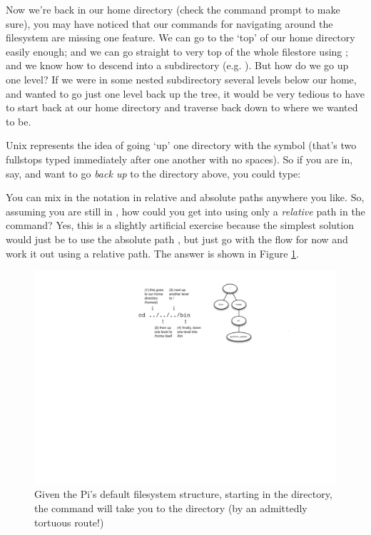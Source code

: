 Now we're back in our home directory (check the command prompt to make sure), you may have noticed that our commands for navigating around the filesystem are missing one feature. We can go to the `top' of our home directory easily enough; and we can go straight to very top of the whole filestore using ; and we know how to descend into a subdirectory (e.g. ). But how do we go up one level? If we were in some nested subdirectory several levels below our home, and wanted to go just one level back up the tree, it would be very tedious to have to start back at our home directory and traverse back down to where we wanted to be. 

Unix represents the idea of going `up' one directory with the  symbol (that's two fullstops typed immediately after one another with no spaces). So if you are in, say,  and want to go \textit{back up} to the directory above, you could type:


You can mix in the  notation in relative and absolute paths anywhere you like. So, assuming you are still in , how could you get into  using only a \textit{relative} path in the  command? Yes, this is a slightly artificial exercise because the simplest solution would just be to use the absolute path , but just go with the flow for now and work it out using a relative path. The answer is shown in Figure \ref{figure:simple-navigation}. 


\begin{figure}[t]
\centerline{\includegraphics[width=13.5cm]{images/simple-navigation}}
\caption{Given the Pi's default filesystem structure, starting in the  directory, the command  will take you to the  directory (by an admittedly tortuous route!)}\label{figure:simple-navigation}
\end{figure}

